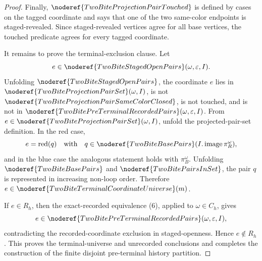 \begin{proof}
Finally, \(\noderef{TwoBiteProjectionPairTouched}\) is defined by cases on the
tagged coordinate and says that one of the two same-color endpoints is
staged-revealed.  Since staged-revealed vertices agree for all base vertices,
the touched predicate agrees for every tagged coordinate.

It remains to prove the terminal-exclusion clause.  Let
\[
e\in\noderef{TwoBiteStagedOpenPairs}(\omega,\varepsilon,I).
\]
Unfolding \(\noderef{TwoBiteStagedOpenPairs}\), the coordinate \(e\) lies in
\(\noderef{TwoBiteProjectionPairSet}(\omega,I)\), is not
\(\noderef{TwoBiteProjectionPairSameColorClosed}\), is not touched, and is not
in \(\noderef{TwoBitePreTerminalRecordedPairs}(\omega,\varepsilon,I)\).
From \(e\in\noderef{TwoBiteProjectionPairSet}(\omega,I)\), unfold the
projected-pair-set definition.  In the red case,
\[
e=\operatorname{red}(q)
\quad\text{with}\quad
q\in\noderef{TwoBiteBasePairs}(I.\operatorname{image}\pi_R^\omega),
\]
and in the blue case the analogous statement holds with \(\pi_B^\omega\).
Unfolding \(\noderef{TwoBiteBasePairs}\) and
\(\noderef{TwoBitePairsInSet}\), the pair \(q\) is represented in increasing
non-loop order.  Therefore \(e\in
\noderef{TwoBiteTerminalCoordinateUniverse}(m)\).

If \(e\in R_h\), then the exact-recorded equivalence (6), applied to
\(\omega\in C_h\), gives
\[
e\in\noderef{TwoBitePreTerminalRecordedPairs}(\omega,\varepsilon,I),
\]
contradicting the recorded-coordinate exclusion in staged-openness.  Hence
\(e\notin R_h\).  This proves the terminal-universe and unrecorded conclusions
and completes the construction of the finite disjoint pre-terminal history
partition.
\end{proof}
